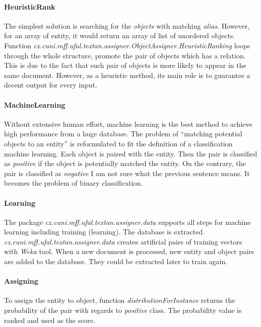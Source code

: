 \paragraph{HeuristicRank}
The simplest solution is searching for the \textit{objects} with matching 
\textit{alias}. However, for an array of entity, it would return an array of 
list of unordered objects. Function
\emph{cz.cuni.mff.ufal.textan.assigner.ObjectAssigner.HeuristicRanking}
loops through the whole structure, promote the pair of objects which has a
relation. This is due to the fact that such pair of objects is more likely to
appear in the same document. However, as a heuristic method, its main role is to
guarantee a decent output for every input.


\paragraph{MachineLearning}
Without extensive human effort, machine learning is the best method to achieve
high performance from a huge database. The problem of ``matching potential
objects to an entity'' is reformulated to fit the definition of a classification
machine learning. Each object is paired with the entity. Then the pair is
classified as \emph{positive} if the object is potentially matched the entity.
On the contrary, the pair is classified as \emph{negative} 
{I am not sure what the previous sentence means}. It becomes the
problem of binary classification.


\paragraph{Learning}
The package \emph{cz.cuni.mff.ufal.textan.assigner.data} supports all steps for
machine learning including training (learning). The database is extracted. 
\emph{cz.cuni.mff.ufal.textan.assigner.data} creates artificial pairs of
training vectors with \textit{Weka} tool. When a new document is processed,
new entity and object pairs are added to the database. They could be extracted
later to train again.

\paragraph{Assigning}
To assign the entity to object, function \emph{distributionForInstance} returns
the probability of the pair with regards to \emph{positive} class. The
probability value is ranked and used as the score.


